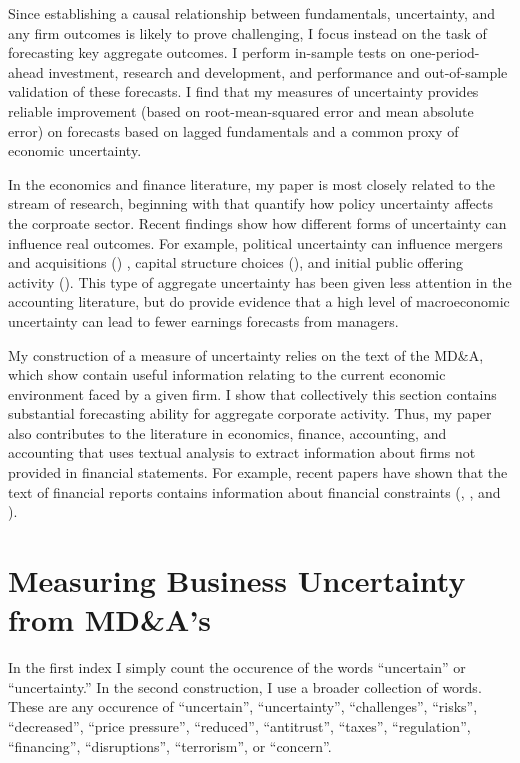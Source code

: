 \documentclass[12pt, letterpaper]{article}
\begin{document}
Since establishing a causal relationship between fundamentals, uncertainty, and any firm outcomes is likely to prove challenging, I focus instead on the task of forecasting key aggregate outcomes. I perform in-sample tests on one-period-ahead investment, research and development, and performance and out-of-sample validation of these forecasts. I find that my measures of uncertainty provides reliable improvement (based on root-mean-squared error and mean absolute error) on forecasts based on lagged fundamentals and a common proxy of economic uncertainty.

In the economics and finance literature, my paper is most closely related to the stream of research, beginning with \cite{bakeretal2016} that quantify how policy uncertainty affects the corproate sector. Recent findings show how different forms of uncertainty can influence real outcomes. For example, political uncertainty can influence mergers and acquisitions (\cite{bonaimeetal2017}) , capital structure choices (\cite{caoetal2013}), and initial public offering activity (\cite{colaketal}). This type of aggregate uncertainty has been given less attention in the accounting literature, but \cite{kimetal2016} do provide evidence that a high level of macroeconomic uncertainty can lead to fewer earnings forecasts from managers.

My construction of a measure of uncertainty relies on the text of the MD\&A, which \cite{browntucker2011} show contain useful information relating to the current economic environment faced by a given firm. I show that collectively this section contains substantial forecasting ability for aggregate corporate activity. Thus, my paper also contributes to the literature in economics, finance, accounting, and accounting that uses textual analysis to extract information about firms not provided in financial statements. For example, recent papers have shown that the text of financial reports contains information about financial constraints (\cite{buehlmaierwhited2017}, \cite{bodnaruketal2015}, and \cite{hobergmaksimovic2015}). 

\section{Measuring Business Uncertainty from MD\&A's}
In the first index I simply count the occurence of the words ``uncertain'' or ``uncertainty.'' In the second construction, I use a broader collection of words. These are any occurence of 
``uncertain'', ``uncertainty'',
``challenges'',
``risks'',
``decreased'',
``price pressure'',
``reduced'',
``antitrust'',
``taxes'',
``regulation'',
``financing'',
``disruptions'',
``terrorism'', or
``concern''.
\end{document}
